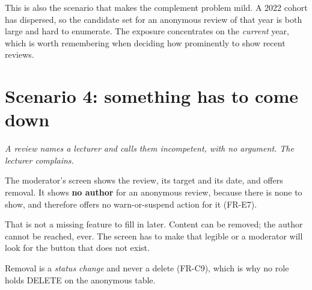 \documentclass[11pt,a4paper]{article}
\begin{document}
\begin{careful}
This is also the scenario that makes the complement problem mild. A 2022 cohort
has dispersed, so the candidate set for an anonymous review of that year is both
large and hard to enumerate. The exposure concentrates on the \emph{current}
year, which is worth remembering when deciding how prominently to show recent
reviews.
\end{careful}

\section{Scenario 4: something has to come down}

\textit{A review names a lecturer and calls them incompetent, with no argument.
The lecturer complains.}

\begin{center}
\end{center}

\begin{why}
The moderator's screen shows the review, its target and its date, and offers
removal. It shows \textbf{no author} for an anonymous review, because there is
none to show, and therefore offers no warn-or-suspend action for it (FR-E7).

That is not a missing feature to fill in later. Content can be removed; the
author cannot be reached, ever. The screen has to make that legible or a
moderator will look for the button that does not exist.

Removal is a \emph{status change} and never a delete (FR-C9), which is why no
role holds DELETE on the anonymous table.
\end{why}
\end{document}
